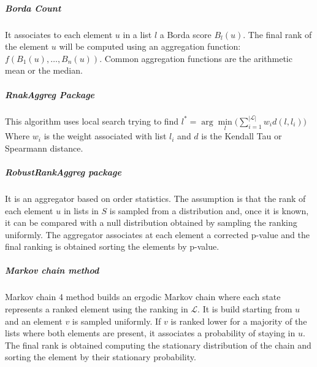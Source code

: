 				\subparagraph{Borda Count}
				It associates to each element $u$ in a list $l$ a Borda score $B_l(u)$.
				The final rank of the element $u$ will be computed using an aggregation function: $f(B_1(u), \dots, B_n(u))$.
				Common aggregation functions are the arithmetic mean or the median.

				\subparagraph{RnakAggreg Package}
				This algorithm uses local search trying to find $l^* = \arg\min\limits_l\biggl( \sum\limits_{i = 1}^{|\mathcal{L}|} w_i d(l,l_i)\biggr)$
				Where $w_i$ is the weight associated with list $l_i$ and $d$ is the Kendall Tau or Spearmann distance.

				\subparagraph{RobustRankAggreg package}
				It is an aggregator based on order statistics.
				The assumption is that the rank of each element $u$ in lists in $S$ is sampled from a distribution and, once it is known, it can be compared with a null distribution obtained by sampling the ranking uniformly.
				The aggregator associates at each element a corrected p-value and the final ranking is obtained sorting the elements by p-value.

				\subparagraph{Markov chain method}
				Markov chain 4 method builds an ergodic Markov chain where each state represents a ranked element using the ranking in $\mathcal{L}$.
				It is build starting from $u$ and an element $v$ is sampled uniformly.
				If $v$ is ranked lower for a majority of the lists where both elements are present, it associates a probability of staying in $u$.
				The final rank is obtained computing the stationary distribution of the chain and sorting the element by their stationary probability.
